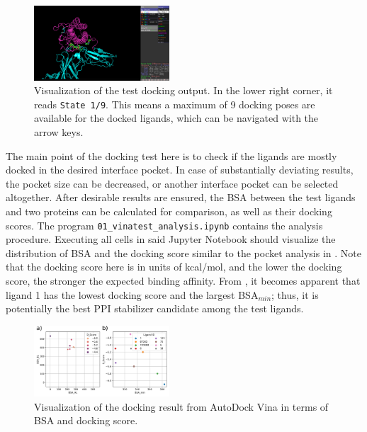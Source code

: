 \documentclass[9pt,tutorial]{livecoms}
\newcommand{\code}[1]{\colorbox{light-gray}{\texttt{#1}}}
\begin{document}
\begin{figure}[H]
\centering
\includegraphics[width=0.45\textwidth]{figures/visualize_docking_pymol.png}
\caption{Visualization of the test docking output. In the lower right corner, it reads \code{State 1/9}. This means a maximum of 9 docking poses are available for the docked ligands, which can be navigated with the arrow keys.}
\label{fig:visualize_docking_pymol}
\end{figure}

The main point of the docking test here is to check if the ligands are mostly docked in the desired interface pocket. In case of substantially deviating results, the pocket size can be decreased, or another interface pocket can be selected altogether. After desirable results are ensured, the BSA between the test ligands and two proteins can be calculated for comparison, as well as their docking scores. The program \code{01\_vinatest\_analysis.ipynb} contains the analysis procedure. Executing all cells in said Jupyter Notebook should visualize the distribution of BSA and the docking score similar to the pocket analysis in . Note that the docking score here is in units of kcal/mol, and the lower the docking score, the stronger the expected binding affinity. From , it becomes apparent that ligand 1 has the lowest docking score and the largest BSA$_{min}$; thus, it is potentially the best PPI stabilizer candidate among the test ligands.

\begin{figure}[H]
\centering
\includegraphics[width=0.45\textwidth]{figures/BSA_dockingscore_vina.png}
\caption{Visualization of the docking result from AutoDock Vina in terms of BSA and docking score.}
\label{fig:BSA_dockingscore_vina}
\end{figure}
\end{document}
